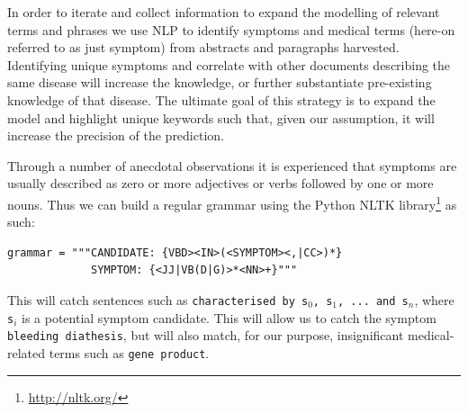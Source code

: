\documentclass[10pt,letterpaper,final]{article}
\begin{document}
In order to iterate and collect information to expand the modelling of
relevant terms and phrases we use NLP to identify symptoms and medical
terms (here-on referred to as just symptom) from abstracts and
paragraphs harvested. Identifying unique symptoms and correlate with
other documents describing the same disease will increase the knowledge,
or further substantiate pre-existing knowledge of that disease. The
ultimate goal of this strategy is to expand the model and highlight
unique keywords such that, given our assumption, it will increase the
precision of the prediction.

Through a number of anecdotal observations it is experienced that
symptoms are usually described as zero or more adjectives or verbs
followed by one or more nouns. Thus we can build a regular grammar using the Python NLTK
library\footnote{\url{http://nltk.org/}} as such:
\begin{lstlisting}
grammar = """CANDIDATE: {VBD><IN>(<SYMPTOM><,|CC>)*}
             SYMPTOM: {<JJ|VB(D|G)>*<NN>+}"""
\end{lstlisting}
This will catch sentences such as \texttt{characterised by s$_{0}$,
s$_{1}$, ... and s$_{n}$}, where \texttt{s$_{i}$} is a potential symptom
candidate.
This will allow us to catch the symptom \texttt{bleeding diathesis}, but
will also match, for our purpose, insignificant medical-related terms
such as \texttt{gene product}.

\end{document}
